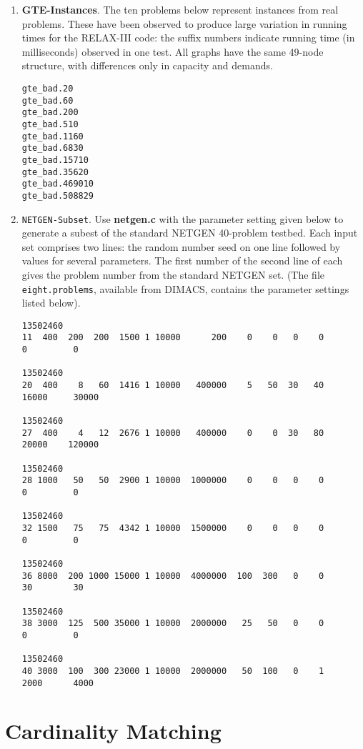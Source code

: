 \begin{enumerate}
\item{\bf GTE-Instances}. The ten problems below represent instances
from real problems.   These have been observed to produce large 
variation in running times for the RELAX-III code: the suffix 
numbers indicate running time (in milliseconds) observed in one test. 
All graphs have the same 49-node structure, with differences only in capacity
and demands. 

\begin{verbatim}
gte_bad.20
gte_bad.60
gte_bad.200
gte_bad.510
gte_bad.1160
gte_bad.6830
gte_bad.15710
gte_bad.35620
gte_bad.469010
gte_bad.508829
\end{verbatim} 

\item{ \tt NETGEN-Subset}.   Use {\bf netgen.c} with the parameter 
setting given below to generate a subest of the standard 
NETGEN 40-problem testbed.  Each input set comprises two lines:  the 
random number 
seed on one line followed by values for several parameters.   The 
first number of the second line of each gives the problem number from the
standard NETGEN set.  (The file {\tt eight.problems}, available from 
DIMACS, contains the parameter settings listed below). 
\begin{verbatim}
13502460
11  400  200  200  1500 1 10000      200    0    0   0    0        0         0

13502460
20  400    8   60  1416 1 10000   400000    5   50  30   40    16000     30000

13502460
27  400    4   12  2676 1 10000   400000    0    0  30   80    20000    120000

13502460   
28 1000   50   50  2900 1 10000  1000000    0    0   0    0        0         0

13502460   
32 1500   75   75  4342 1 10000  1500000    0    0   0    0        0         0

13502460   
36 8000  200 1000 15000 1 10000  4000000  100  300   0    0       30        30

13502460   
38 3000  125  500 35000 1 10000  2000000   25   50   0    0        0         0

13502460 
40 3000  100  300 23000 1 10000  2000000   50  100   0    1     2000      4000
\end{verbatim} 

\end{enumerate} 

\section{Cardinality Matching}

